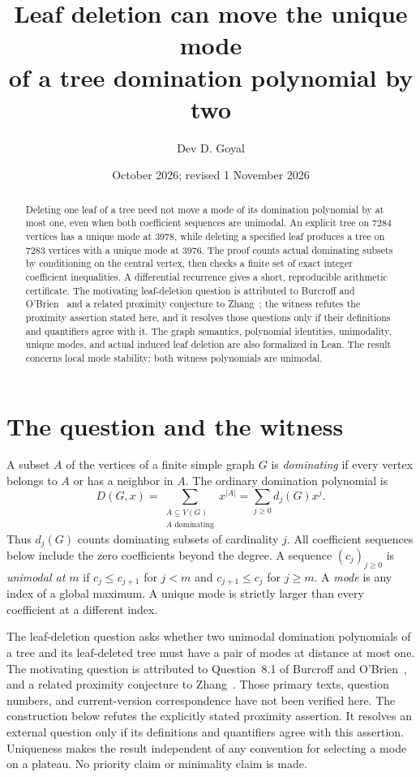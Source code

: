 \documentclass[11pt]{article}
\title{Leaf deletion can move the unique mode\\of a tree domination polynomial by two}
\author{Dev D. Goyal}
\date{October 2026; revised 1 November 2026}
\newcommand{\D}{D}
\begin{document}
\maketitle
\begin{abstract}
Deleting one leaf of a tree need not move a mode of its domination polynomial by at most one, even when both coefficient sequences are unimodal. An explicit tree on $7284$ vertices has a unique mode at $3978$, while deleting a specified leaf produces a tree on $7283$ vertices with a unique mode at $3976$. The proof counts actual dominating subsets by conditioning on the central vertex, then checks a finite set of exact integer coefficient inequalities. A differential recurrence gives a short, reproducible arithmetic certificate. The motivating leaf-deletion question is attributed to Burcroff and O'Brien~\cite{burcroff} and a related proximity conjecture to Zhang~\cite{zhang}; the witness refutes the proximity assertion stated here, and it resolves those questions only if their definitions and quantifiers agree with it. The graph semantics, polynomial identities, unimodality, unique modes, and actual induced leaf deletion are also formalized in Lean. The result concerns local mode stability; both witness polynomials are unimodal.
\end{abstract}

\section{The question and the witness}
A subset $A$ of the vertices of a finite simple graph $G$ is \emph{dominating} if every vertex belongs to $A$ or has a neighbor in $A$. The ordinary domination polynomial is
\[
 \D(G,x)=\sum_{\substack{A\subseteq V(G)\\A\text{ dominating}}}x^{|A|}
        =\sum_{j\ge0}d_j(G)x^j.
\]
Thus $d_j(G)$ counts dominating subsets of cardinality $j$. All coefficient sequences below include the zero coefficients beyond the degree. A sequence $(c_j)_{j\ge0}$ is \emph{unimodal at $m$} if $c_j\le c_{j+1}$ for $j<m$ and $c_{j+1}\le c_j$ for $j\ge m$. A \emph{mode} is any index of a global maximum. A unique mode is strictly larger than every coefficient at a different index.

The leaf-deletion question asks whether two unimodal domination polynomials of a tree and its leaf-deleted tree must have a pair of modes at distance at most one. The motivating question is attributed to Question~8.1 of Burcroff and O'Brien~\cite{burcroff}, and a related proximity conjecture to Zhang~\cite{zhang}. Those primary texts, question numbers, and current-version correspondence have not been verified here. The construction below refutes the explicitly stated proximity assertion. It resolves an external question only if its definitions and quantifiers agree with this assertion. Uniqueness makes the result independent of any convention for selecting a mode on a plateau. No priority claim or minimality claim is made.
\end{document}
